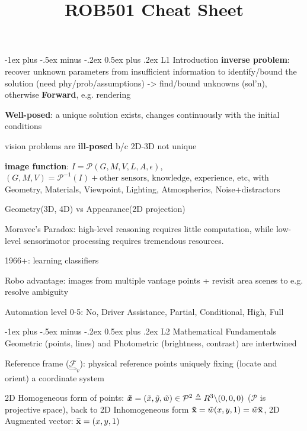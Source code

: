 \documentclass[10pt,landscape]{article}
\title{ROB501 Cheat Sheet}
\makeatletter
\renewcommand{\section}{\@startsection{section}{1}{0mm}%
                                {-1ex plus -.5ex minus -.2ex}%
                                {0.5ex plus .2ex}%
                                {\normalfont\large\bfseries}}
\makeatother
\begin{document}
\raggedright
\footnotesize

\begin{multicols}{3}
\setlength{\premulticols}{1pt}
\setlength{\postmulticols}{1pt}
\setlength{\multicolsep}{1pt}
\setlength{\columnsep}{2pt}

\section{L1 Introduction}
\textbf{inverse problem}: recover unknown parameters from insufficient information to identify/bound the solution (need phy/prob/assumptions) -> find/bound unknowns (sol’n), otherwise \textbf{Forward}, e.g. rendering

\textbf{Well-posed}:  a unique solution exists, changes continuously with the initial conditions

vision problems are \textbf{ill-posed} b/c 2D-3D not unique

\textbf{image function}: $I = \mathcal{P}(G, M, V, L, A, \epsilon)$, $(G, M, V) = \mathcal{P}^{-1}(I) + \text{other sensors, knowledge, experience, etc}$, with Geometry, Materials, Viewpoint, Lighting, Atmospherics, Noise+distractors

Geometry(3D, 4D) vs Appearance(2D projection)

Moravec's Paradox: high-level reasoning requires little computation, while low-level sensorimotor processing requires tremendous resources.

1966+: learning classifiers

Robo advantage: images from multiple vantage points + revisit area scenes to e.g. resolve ambiguity

Automation level 0-5: No, Driver Assistance, Partial, Conditional, High, Full


\section{L2 Mathematical Fundamentals}
Geometric (points, lines) and Photometric (brightness, contrast) are intertwined

Reference frame ($\underset{\Rightarrow}{\mathcal{F}}_v$): physical reference points uniquely fixing (locate and orient) a coordinate system

2D Homogeneous form of points: $\bm{\Tilde{x}} = (\Tilde{x}, \Tilde{y}, \Tilde{w})\in \mathcal{P}^2 \triangleq R^3 \backslash (0,0,0)$ ($\mathcal{P}$ is projective space), back to 2D Inhomogeneous form $\mathbf{\Tilde{x}} = \Tilde{w}(x, y, 1) = \Tilde{w}\mathbf{\Bar{x}}$, 2D Augmented vector:  $\mathbf{\Bar{x}} = (x, y, 1)$


\end{multicols}
\end{document}
